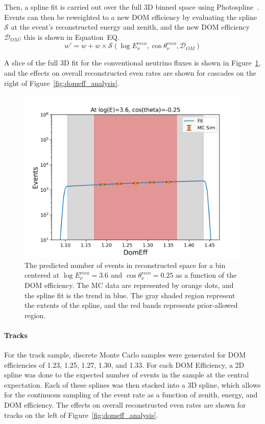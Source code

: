\documentclass[main.tex]{subfiles}
\begin{document}
Then, a spline fit is carried out over the full 3D binned space using Photospline~\cite{WHITEHORN20132214}. 
Events can then be reweighted to a new DOM efficiency by evaluating the spline $\mathcal{S}$ at the event's reconstructed energy and zenith, and the new DOM efficiency $\mathcal{D}_{OM}$; this is shown in Equation~EQ.
\begin{equation}\label{eq:domeff}
    w' = w + w\times \mathcal{S}(\log E_{\nu}^{reco}, \cos\theta_{\nu}^{reco}, \mathcal{D}_{OM})
\end{equation}

A slice of the full 3D fit for the conventional neutrino fluxes is shown in Figure~\ref{fig:domeff_fit}, and the effects on overall reconstructed even rates are shown for cascades on the right of Figure~\ref{fig:domeff_analysis}.
\begin{figure}
    \centering
    \includegraphics[width=0.75\linewidth]{figures/atmConv_logE_3.6_cosz_-0.25.png}
    \caption{The predicted number of events in reconstructed space for a bin centered at $\log E_{\nu}^{reco}=3.6$ and $\cos\theta_{\nu}^{reco}=0.25$ as a function of the DOM efficiency. The MC data are represented by orange dots, and the spline fit is the trend in blue. The gray shaded region represent the extents of the spline, and the red bands represents prior-allowed region.}\label{fig:domeff_fit}
\end{figure}




\paragraph{Tracks}

For the track sample, discrete Monte Carlo samples were generated for DOM efficiencies of 1.23, 1.25, 1.27, 1.30, and 1.33. 
For each DOM Efficiency, a 2D spline was done to the expected number of events in the sample at the central expectation. 
Each of these splines was then stacked into a 3D spline, which allows for the continuous sampling of the event rate as a function of zenith, energy, and DOM efficiency. 
The effects on overall reconstructed even rates are shown for tracks on the left of Figure~\ref{fig:domeff_analysis}.
\end{document}

